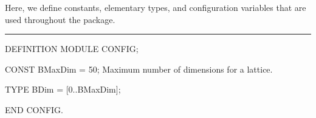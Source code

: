 
Here, we define constants, elementary types, and configuration variables 
that are used throughout the package.

\bigskip\hrule
\code

DEFINITION MODULE CONFIG;

CONST
   BMaxDim = 50;
\endcode
 \tabb  Maximum number of dimensions for a lattice.
 \endtabb
\code

TYPE
   BDim = [0..BMaxDim];

END CONFIG.
\endcode
